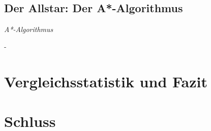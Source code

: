 \documentclass[12pt]{article}
\begin{document}
\subsection{Der Allstar: Der A*-Algorithmus}
\begin{algorithm}
\caption{\textit{A*-Algorithmus} \label{alg:astar}}
\begin{algorithmic}[1]
\Statex
{}
\Statex
\end{algorithmic}
\end{algorithm}
\newpage
-
\newpage

\section{Vergleichsstatistik und Fazit}
\newpage
\section{Schluss}
\newpage
\end{document}
